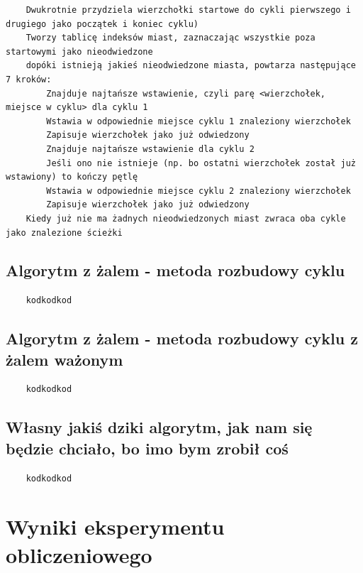 \documentclass[11pt]{article}
\begin{document}
\begin{verbatim}
    Dwukrotnie przydziela wierzchołki startowe do cykli pierwszego i drugiego jako początek i koniec cyklu)
    Tworzy tablicę indeksów miast, zaznaczając wszystkie poza startowymi jako nieodwiedzone
    dopóki istnieją jakieś nieodwiedzone miasta, powtarza następujące 7 kroków:
        Znajduje najtańsze wstawienie, czyli parę <wierzchołek, miejsce w cyklu> dla cyklu 1
        Wstawia w odpowiednie miejsce cyklu 1 znaleziony wierzchołek
        Zapisuje wierzchołek jako już odwiedzony
        Znajduje najtańsze wstawienie dla cyklu 2
        Jeśli ono nie istnieje (np. bo ostatni wierzchołek został już wstawiony) to kończy pętlę
        Wstawia w odpowiednie miejsce cyklu 2 znaleziony wierzchołek
        Zapisuje wierzchołek jako już odwiedzony
    Kiedy już nie ma żadnych nieodwiedzonych miast zwraca oba cykle jako znalezione ścieżki

\end{verbatim}

\subsection{Algorytm z żalem - metoda rozbudowy cyklu}\label{subsec:algorytm-z-zalem---metoda-rozbudowy-cyklu}

\begin{verbatim}
    kodkodkod
\end{verbatim}

\subsection{Algorytm z żalem - metoda rozbudowy cyklu z żalem ważonym}\label{subsec:algorytm-z-zalem---metoda-rozbudowy-cyklu-z-zalem-wazonym}

\begin{verbatim}
    kodkodkod
\end{verbatim}

\subsection{Własny jakiś dziki algorytm, jak nam się będzie chciało, bo imo bym zrobił coś}

\begin{verbatim}
    kodkodkod
\end{verbatim}


\section{Wyniki eksperymentu obliczeniowego}\label{sec:wyniki-eksperymenty-obliczeniowego}
\end{document}
